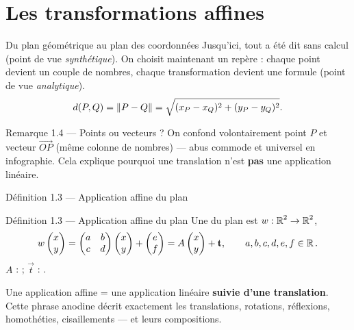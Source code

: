 \section{Les transformations affines}

\begin{frame}{Du plan géométrique au plan des coordonnées}
  \small Jusqu'ici, tout a été dit sans calcul (point de vue
  \emph{synthétique}). On choisit maintenant un repère : chaque point
  devient un couple de nombres, chaque transformation devient une
  formule (point de vue \emph{analytique}).
  \[
    d(P,Q) = \lVert P - Q \rVert = \sqrt{(x_P-x_Q)^2 + (y_P-y_Q)^2}.
  \]
  \begin{Rem}{Remarque 1.4 --- Points ou vecteurs ?}
    \small On confond volontairement point $P$ et vecteur
    $\overrightarrow{OP}$ (même colonne de nombres) --- abus commode et
    universel en infographie. Cela explique pourquoi une translation
    n'est \textbf{pas} une application linéaire.
  \end{Rem}
\end{frame}

\begin{frame}{Définition 1.3 --- Application affine du plan}
  \begin{Enonce}{Définition 1.3 --- Application affine du plan}
    Une  du plan est $w:\operatorname{\mathbb{R}}^2\to\operatorname{\mathbb{R}}^2$,
    \[
      w\begin{pmatrix}x\\ y\end{pmatrix} = \begin{pmatrix}a & b\\ c & d\end{pmatrix}\begin{pmatrix}x\\ y\end{pmatrix} + \begin{pmatrix}e\\ f\end{pmatrix}
      = A\begin{pmatrix}x\\ y\end{pmatrix} + \mathbf{t}, \qquad a,b,c,d,e,f\in\operatorname{\mathbb{R}}.
    \]
    $A$ :  ; $\vec t$ : .
  \end{Enonce}
  \vspace{4pt}
  Une application affine = une application linéaire \textbf{suivie
  d'une translation}. Cette phrase anodine décrit exactement les
  translations, rotations, réflexions, homothéties, cisaillements ---
  et leurs compositions.
\end{frame}

